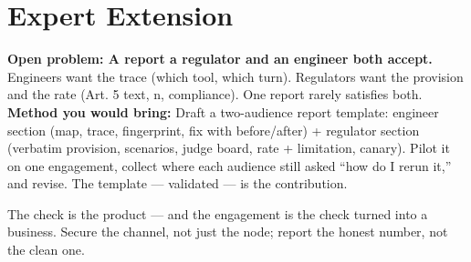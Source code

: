 \section{Expert Extension}
\rbadge
\textbf{Open problem: A report a regulator and an engineer both accept.} Engineers want the trace (which tool, which turn). Regulators want the provision and the rate (Art. 5 text, n, compliance). One report rarely satisfies both.\\
\textbf{Method you would bring:} Draft a two-audience report template: engineer section (map, trace, fingerprint, fix with before/after) + regulator section (verbatim provision, scenarios, judge board, rate + limitation, canary). Pilot it on one engagement, collect where each audience still asked ``how do I rerun it,'' and revise. The template — validated — is the contribution.

\begin{checkbox}
The check is the product — and the engagement is the check turned into a business. Secure the channel, not just the node; report the honest number, not the clean one.
\end{checkbox}
